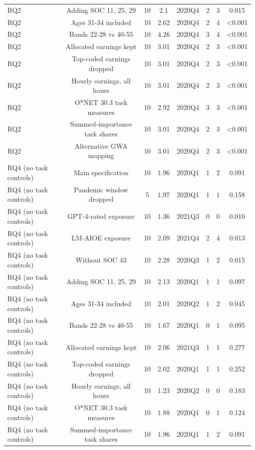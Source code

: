 \begin{table}[htbp]
\begin{tabular}{lccccccc}
RQ2 & Adding SOC 11, 25, 29 & 10 & 2.1 & 2020Q4 & 2 & 3 & 0.015 \\
RQ2 & Ages 31-34 included & 10 & 2.62 & 2020Q4 & 2 & 4 & <0.001 \\
RQ2 & Bands 22-28 vs 40-55 & 10 & 4.26 & 2020Q4 & 3 & 4 & <0.001 \\
RQ2 & Allocated earnings kept & 10 & 3.01 & 2020Q4 & 2 & 3 & <0.001 \\
RQ2 & Top-coded earnings dropped & 10 & 3.01 & 2020Q4 & 2 & 3 & <0.001 \\
RQ2 & Hourly earnings, all hours & 10 & 3.01 & 2020Q4 & 2 & 3 & <0.001 \\
RQ2 & O*NET 30.3 task measures & 10 & 2.92 & 2020Q4 & 3 & 3 & <0.001 \\
RQ2 & Summed-importance task shares & 10 & 3.01 & 2020Q4 & 2 & 3 & <0.001 \\
RQ2 & Alternative GWA mapping & 10 & 3.01 & 2020Q4 & 2 & 3 & <0.001 \\
RQ4 (no task controls) & Main specification & 10 & 1.96 & 2020Q1 & 1 & 2 & 0.091 \\
RQ4 (no task controls) & Pandemic window dropped & 5 & 1.97 & 2020Q1 & 1 & 1 & 0.158 \\
RQ4 (no task controls) & GPT-4-rated exposure & 10 & 1.36 & 2021Q3 & 0 & 0 & 0.010 \\
RQ4 (no task controls) & LM-AIOE exposure & 10 & 2.09 & 2021Q4 & 2 & 4 & 0.013 \\
RQ4 (no task controls) & Without SOC 43 & 10 & 2.28 & 2020Q3 & 1 & 2 & 0.015 \\
RQ4 (no task controls) & Adding SOC 11, 25, 29 & 10 & 2.13 & 2020Q1 & 1 & 1 & 0.097 \\
RQ4 (no task controls) & Ages 31-34 included & 10 & 2.01 & 2020Q2 & 1 & 2 & 0.045 \\
RQ4 (no task controls) & Bands 22-28 vs 40-55 & 10 & 1.67 & 2020Q1 & 0 & 1 & 0.095 \\
RQ4 (no task controls) & Allocated earnings kept & 10 & 2.06 & 2021Q3 & 1 & 1 & 0.277 \\
RQ4 (no task controls) & Top-coded earnings dropped & 10 & 2.02 & 2020Q1 & 1 & 1 & 0.252 \\
RQ4 (no task controls) & Hourly earnings, all hours & 10 & 1.23 & 2020Q2 & 0 & 0 & 0.183 \\
RQ4 (no task controls) & O*NET 30.3 task measures & 10 & 1.88 & 2020Q1 & 0 & 1 & 0.124 \\
RQ4 (no task controls) & Summed-importance task shares & 10 & 1.96 & 2020Q1 & 1 & 2 & 0.091 \\

\end{tabular}
\end{table}
